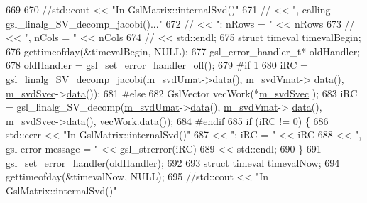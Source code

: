 \begin{DoxyCode}
669     
670     \textcolor{comment}{//std::cout << "In GslMatrix::internalSvd()"}
671     \textcolor{comment}{//          << ", calling gsl\_linalg\_SV\_decomp\_jacobi()..."}
672     \textcolor{comment}{//          << ": nRows = " << nRows}
673     \textcolor{comment}{//          << ", nCols = " << nCols}
674     \textcolor{comment}{//          << std::endl;}
675     \textcolor{keyword}{struct }timeval timevalBegin;
676     gettimeofday(&timevalBegin, NULL);
677     gsl\_error\_handler\_t* oldHandler;
678     oldHandler = gsl\_set\_error\_handler\_off();
679 \textcolor{preprocessor}{#if 1}
680 \textcolor{preprocessor}{}    iRC = gsl\_linalg\_SV\_decomp\_jacobi(\hyperlink{class_q_u_e_s_o_1_1_gsl_matrix_a764128029cce1c35d7371c6a7faf4161}{m\_svdUmat}->\hyperlink{class_q_u_e_s_o_1_1_gsl_matrix_a4457fa070f872987233806347c61e6bd}{data}(), \hyperlink{class_q_u_e_s_o_1_1_gsl_matrix_a13355e2467b03cf8ff514659802794e0}{m\_svdVmat}->
      \hyperlink{class_q_u_e_s_o_1_1_gsl_matrix_a4457fa070f872987233806347c61e6bd}{data}(), \hyperlink{class_q_u_e_s_o_1_1_gsl_matrix_a9c2d46159d01da442aba68fbeecb2dfc}{m\_svdSvec}->\hyperlink{class_q_u_e_s_o_1_1_gsl_vector_a6a668d6e6cdf69e3004e07742d066036}{data}());
681 \textcolor{preprocessor}{#else}
682 \textcolor{preprocessor}{}    GslVector vecWork(*\hyperlink{class_q_u_e_s_o_1_1_gsl_matrix_a9c2d46159d01da442aba68fbeecb2dfc}{m\_svdSvec} );
683     iRC = gsl\_linalg\_SV\_decomp(\hyperlink{class_q_u_e_s_o_1_1_gsl_matrix_a764128029cce1c35d7371c6a7faf4161}{m\_svdUmat}->\hyperlink{class_q_u_e_s_o_1_1_gsl_matrix_a4457fa070f872987233806347c61e6bd}{data}(), \hyperlink{class_q_u_e_s_o_1_1_gsl_matrix_a13355e2467b03cf8ff514659802794e0}{m\_svdVmat}->
      \hyperlink{class_q_u_e_s_o_1_1_gsl_matrix_a4457fa070f872987233806347c61e6bd}{data}(), \hyperlink{class_q_u_e_s_o_1_1_gsl_matrix_a9c2d46159d01da442aba68fbeecb2dfc}{m\_svdSvec}->\hyperlink{class_q_u_e_s_o_1_1_gsl_vector_a6a668d6e6cdf69e3004e07742d066036}{data}(), vecWork.data());
684 \textcolor{preprocessor}{#endif}
685 \textcolor{preprocessor}{}    \textcolor{keywordflow}{if} (iRC != 0) \{
686       std::cerr << \textcolor{stringliteral}{"In GslMatrix::internalSvd()"}
687                 << \textcolor{stringliteral}{": iRC = "} << iRC
688                 << \textcolor{stringliteral}{", gsl error message = "} << gsl\_strerror(iRC)
689                 << std::endl;
690     \}
691     gsl\_set\_error\_handler(oldHandler);
692 
693     \textcolor{keyword}{struct }timeval timevalNow;
694     gettimeofday(&timevalNow, NULL);
695     \textcolor{comment}{//std::cout << "In GslMatrix::internalSvd()"}

\end{DoxyCode}
